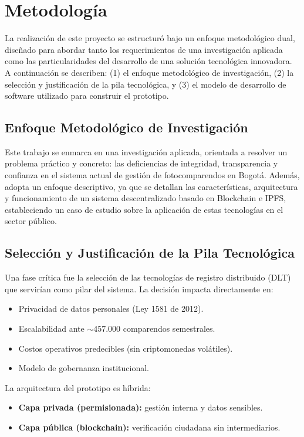 \section{Metodología}

La realización de este proyecto se estructuró bajo un enfoque metodológico dual, diseñado para abordar tanto los requerimientos de una investigación aplicada como las particularidades del desarrollo de una solución tecnológica innovadora. A continuación se describen: (1) el enfoque metodológico de investigación, (2) la selección y justificación de la pila tecnológica, y (3) el modelo de desarrollo de software utilizado para construir el prototipo.

\subsection{Enfoque Metodológico de Investigación}

Este trabajo se enmarca en una investigación aplicada, orientada a resolver un problema práctico y concreto: las deficiencias de integridad, transparencia y confianza en el sistema actual de gestión de fotocomparendos en Bogotá. Además, adopta un enfoque descriptivo, ya que se detallan las características, arquitectura y funcionamiento de un sistema descentralizado basado en Blockchain e IPFS, estableciendo un caso de estudio sobre la aplicación de estas tecnologías en el sector público.

\subsection{Selección y Justificación de la Pila Tecnológica}

Una fase crítica fue la selección de las tecnologías de registro distribuido (DLT) que servirían como pilar del sistema. La decisión impacta directamente en:

\begin{itemize}
    \item Privacidad de datos personales (Ley 1581 de 2012).
    \item Escalabilidad ante $\sim$457.000 comparendos semestrales.
    \item Costos operativos predecibles (sin criptomonedas volátiles).
    \item Modelo de gobernanza institucional.
\end{itemize}

La arquitectura del prototipo es híbrida:
\begin{itemize}
    \item \textbf{Capa privada (permisionada):} gestión interna y datos sensibles.
    \item \textbf{Capa pública (blockchain):} verificación ciudadana sin intermediarios.
\end{itemize}

